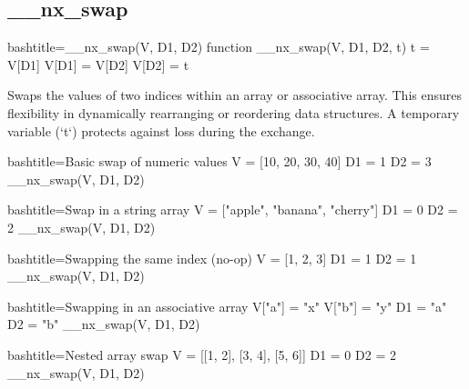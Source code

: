 \newpage
\subsection{__nx_swap}
\label{__nx_swap}
\begin{NexCodeBox}{bash}{title={__nx_swap(V, D1, D2)}}
function __nx_swap(V, D1, D2, t) {
	t = V[D1]
	V[D1] = V[D2]
	V[D2] = t
}
\end{NexCodeBox}

\begin{NexMainBox}
	\begin{NexMainBox}
		Swaps the values of two indices within an array or associative array. This ensures flexibility in dynamically rearranging or reordering data structures. A temporary variable (`t`) protects against loss during the exchange.
	\end{NexMainBox}
	\begin{NexMainBox}
		\begin{NexListDark}
		\end{NexListDark}
	\end{NexMainBox}
\end{NexMainBox}

\begin{NexCodeBox}{bash}{title={Basic swap of numeric values}}
	V = [10, 20, 30, 40]
	D1 = 1
	D2 = 3
	__nx_swap(V, D1, D2)
\end{NexCodeBox}

\begin{NexCodeBox}{bash}{title={Swap in a string array}}
	V = ["apple", "banana", "cherry"]
	D1 = 0
	D2 = 2
	__nx_swap(V, D1, D2)
\end{NexCodeBox}

\begin{NexCodeBox}{bash}{title={Swapping the same index (no-op)}}
	V = [1, 2, 3]
	D1 = 1
	D2 = 1
	__nx_swap(V, D1, D2)
\end{NexCodeBox}

\begin{NexCodeBox}{bash}{title={Swapping in an associative array}}
	V["a"] = "x"
	V["b"] = "y"
	D1 = "a"
	D2 = "b"
	__nx_swap(V, D1, D2)
\end{NexCodeBox}

\begin{NexCodeBox}{bash}{title={Nested array swap}}
	V = [[1, 2], [3, 4], [5, 6]]
	D1 = 0
	D2 = 2
	__nx_swap(V, D1, D2)
\end{NexCodeBox}

